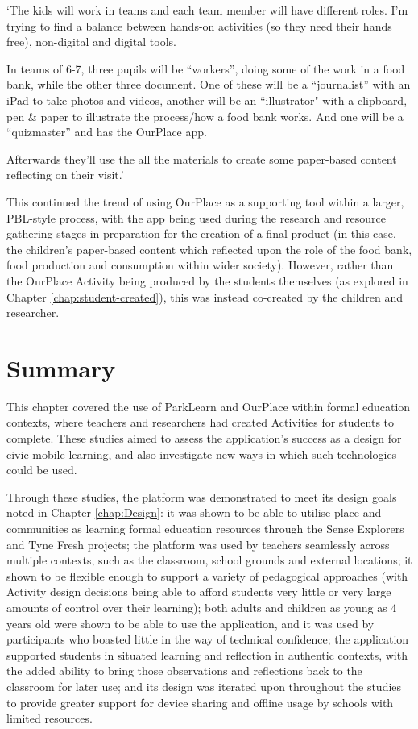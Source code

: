 \begin{displayquote}
`The kids will work in teams and each team member will have different roles. I’m trying to find a balance between hands-on activities (so they need their hands free), non-digital and digital tools.

In teams of 6-7, three pupils will be “workers”, doing some of the work in a food bank, while the other three document. One of these will be a “journalist” with an iPad to take photos and videos, another will be an “illustrator" with a clipboard, pen \& paper to illustrate the process/how a food bank works. And one will be a “quizmaster” and has the OurPlace app.

Afterwards they’ll use the all the materials to create some paper-based content reflecting on their visit.'
\end{displayquote}

This continued the trend of using OurPlace as a supporting tool within a larger, PBL-style process, with the app being used during the research and resource gathering stages in preparation for the creation of a final product (in this case, the children's paper-based content which reflected upon the role of the food bank, food production and consumption within wider society). However, rather than the OurPlace Activity being produced by the students themselves (as explored in Chapter \ref{chap:student-created}), this was instead co-created by the children and researcher.

\section{Summary}

This chapter covered the use of ParkLearn and OurPlace within formal education contexts, where teachers and researchers had created Activities for students to complete. These studies aimed to assess the application's success as a design for civic mobile learning, and also investigate new ways in which such technologies could be used. 

Through these studies, the platform was demonstrated to meet its design goals noted in Chapter \ref{chap:Design}: it was shown to be able to utilise place and communities as learning formal education resources through the Sense Explorers and Tyne Fresh projects; the platform was used by teachers seamlessly across multiple contexts, such as the classroom, school grounds and external locations; it shown to be flexible enough to support a variety of pedagogical approaches (with Activity design decisions being able to afford students very little or very large amounts of control over their learning); both adults and children as young as 4 years old were shown to be able to use the application, and it was used by participants who boasted little in the way of technical confidence; the application supported students in situated learning and reflection in authentic contexts, with the added ability to bring those observations and reflections back to the classroom for later use; and its design was iterated upon throughout the studies to provide greater support for device sharing and offline usage by schools with limited resources. 

